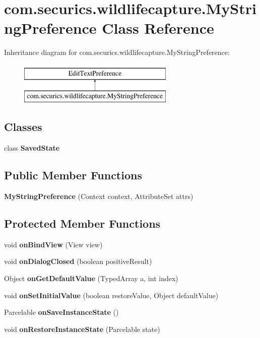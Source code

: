 \section{com.\+securics.\+wildlifecapture.\+My\+String\+Preference Class Reference}
\label{classcom_1_1securics_1_1wildlifecapture_1_1_my_string_preference}
Inheritance diagram for com.\+securics.\+wildlifecapture.\+My\+String\+Preference\+:\begin{figure}[H]
\begin{center}
\leavevmode
\includegraphics[height=2.000000cm]{classcom_1_1securics_1_1wildlifecapture_1_1_my_string_preference}
\end{center}
\end{figure}
\subsection*{Classes}
\begin{DoxyCompactItemize}
\item 
class {\bfseries Saved\+State}
\end{DoxyCompactItemize}
\subsection*{Public Member Functions}
\begin{DoxyCompactItemize}
\item 
{\bf My\+String\+Preference} (Context context, Attribute\+Set attrs)
\end{DoxyCompactItemize}
\subsection*{Protected Member Functions}
\begin{DoxyCompactItemize}
\item 
void {\bf on\+Bind\+View} (View view)
\item 
void {\bf on\+Dialog\+Closed} (boolean positive\+Result)
\item 
Object {\bf on\+Get\+Default\+Value} (Typed\+Array a, int index)
\item 
void {\bf on\+Set\+Initial\+Value} (boolean restore\+Value, Object default\+Value)
\item 
Parcelable {\bf on\+Save\+Instance\+State} ()
\item 
void {\bf on\+Restore\+Instance\+State} (Parcelable state)
\end{DoxyCompactItemize}
